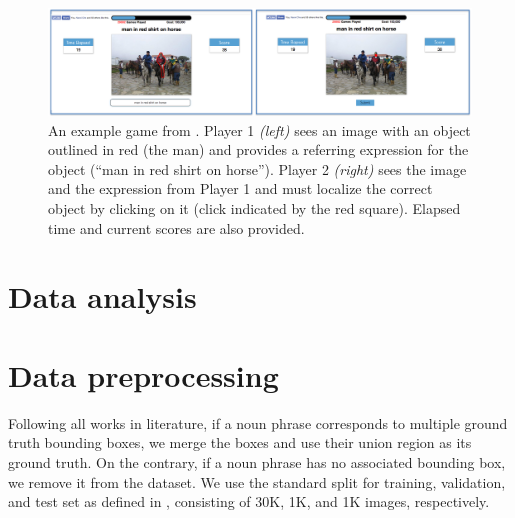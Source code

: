 \begin{figure}
  \includegraphics[width=\textwidth]{figures/referitgame-example.png}
  \caption[ReferIt Game Example.]{An example game from . Player 1 \textit{(left)} sees an image with an object
  outlined in red (the man) and provides a referring expression for
  the object (``man in red shirt on horse''). Player 2
  \textit{(right)} sees the image and the expression from Player 1 and
  must localize the correct object by clicking on it (click indicated
  by the red square). Elapsed time and current scores are also
  provided.}
  \label{fig:referitgame-example}
\end{figure}

\section{Data analysis}


\section{Data preprocessing}

Following all works in literature, if a noun phrase
corresponds to multiple ground truth bounding boxes, we merge the
boxes and use their union region as its ground truth. On the contrary,
if a noun phrase has no associated bounding box, we remove it from the
dataset. We use the standard split for training, validation, and test
set as defined in  , consisting of 30K,
1K, and 1K images, respectively.